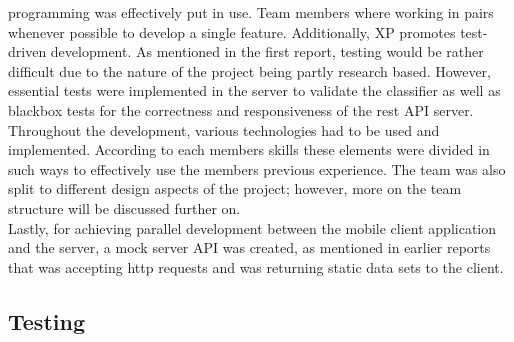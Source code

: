 programming was effectively put in use. Team members where working in pairs whenever possible to 
develop a single feature. Additionally, XP promotes test-driven development. As mentioned in the 
first report, testing would be rather difficult due to the nature of the project being partly 
research based. However, essential tests were implemented in the server to validate the classifier 
as well as blackbox tests for the correctness and responsiveness of the rest API server. \\ 
Throughout the development, various technologies had to be used and implemented. According to each 
members skills these elements were divided in such ways to effectively use the members previous 
experience. The team was also split to different design aspects of the project; however, more on the 
team structure will be discussed further on.\\ 
Lastly, for achieving parallel development between 
the mobile client application and the server, a mock server API was created, as mentioned in earlier 
reports that was accepting http requests and was returning static data sets to the client. 

\subsection{Testing} 
